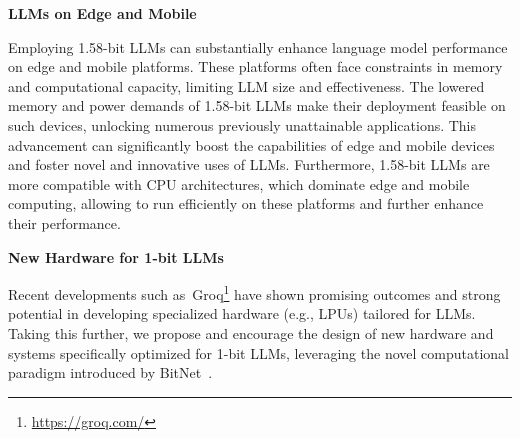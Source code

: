 \textbf{LLMs on Edge and Mobile}

Employing 1.58-bit LLMs can substantially enhance language model performance on edge and mobile platforms. These platforms often face constraints in memory and computational capacity, limiting LLM size and effectiveness. The lowered memory and power demands of 1.58-bit LLMs make their deployment feasible on such devices, unlocking numerous previously unattainable applications. This advancement can significantly boost the capabilities of edge and mobile devices and foster novel and innovative uses of LLMs. Furthermore, 1.58-bit LLMs are more compatible with CPU architectures, which dominate edge and mobile computing, allowing  to run efficiently on these platforms and further enhance their performance.

\textbf{New Hardware for 1-bit LLMs}

Recent developments such as~Groq\footnote{\url{https://groq.com/}} have shown promising outcomes and strong potential in developing specialized hardware (e.g., LPUs) tailored for LLMs. Taking this further, we propose and encourage the design of new hardware and systems specifically optimized for 1-bit LLMs, leveraging the novel computational paradigm introduced by BitNet~\cite{bitnet}.

